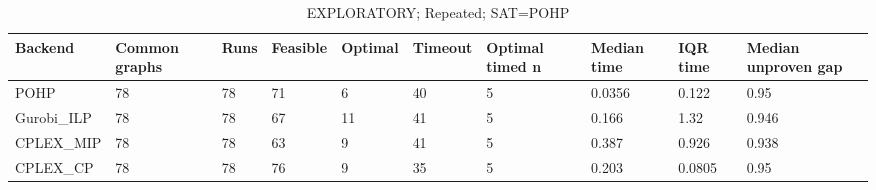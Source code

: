 \begin{table}[htbp]
\centering
\caption{EXPLORATORY; Repeated; SAT=POHP}
\label{tab:p2b-Repeated-exploratory-backends}
\begin{tabular}{llllllllll}
\hline
Backend & Common graphs & Runs & Feasible & Optimal & Timeout & Optimal timed n & Median time & IQR time & Median unproven gap \\
\hline
POHP & 78 & 78 & 71 & 6 & 40 & 5 & 0.0356 & 0.122 & 0.95 \\
Gurobi\_ILP & 78 & 78 & 67 & 11 & 41 & 5 & 0.166 & 1.32 & 0.946 \\
CPLEX\_MIP & 78 & 78 & 63 & 9 & 41 & 5 & 0.387 & 0.926 & 0.938 \\
CPLEX\_CP & 78 & 78 & 76 & 9 & 35 & 5 & 0.203 & 0.0805 & 0.95 \\
\hline
\end{tabular}
\end{table}
